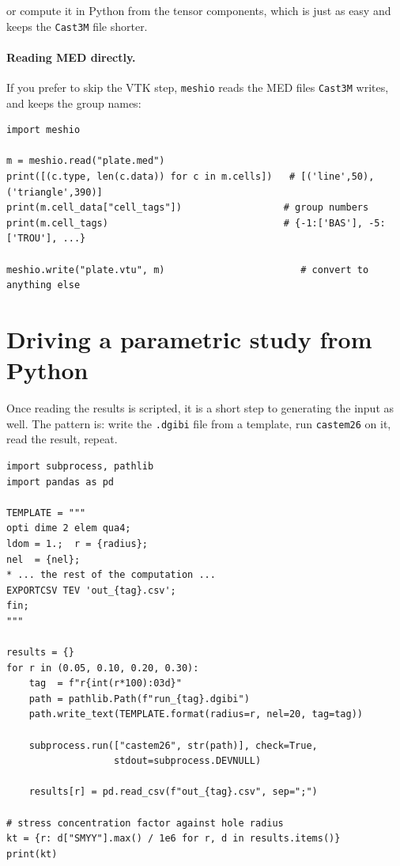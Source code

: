 \noindent or compute it in Python from the tensor components, which is just
as easy and keeps the \texttt{Cast3M} file shorter.

\paragraph{Reading MED directly.} If you prefer to skip the VTK step,
\texttt{meshio} reads the MED files \texttt{Cast3M} writes, and keeps the
group names:

\begin{codebox}
\begin{verbatim}
import meshio

m = meshio.read("plate.med")
print([(c.type, len(c.data)) for c in m.cells])   # [('line',50),('triangle',390)]
print(m.cell_data["cell_tags"])                  # group numbers
print(m.cell_tags)                               # {-1:['BAS'], -5:['TROU'], ...}

meshio.write("plate.vtu", m)                        # convert to anything else
\end{verbatim}
\end{codebox}

\section{Driving a parametric study from Python}
\label{sec:py:param}

%
Once reading the results is scripted, it is a short step to generating the
input as well. The pattern is: write the \texttt{.dgibi} file from a
template, run \texttt{castem26} on it, read the result, repeat.

\begin{codebox}
\begin{verbatim}
import subprocess, pathlib
import pandas as pd

TEMPLATE = """
opti dime 2 elem qua4;
ldom = 1.;  r = {radius};
nel  = {nel};
* ... the rest of the computation ...
EXPORTCSV TEV 'out_{tag}.csv';
fin;
"""

results = {}
for r in (0.05, 0.10, 0.20, 0.30):
    tag  = f"r{int(r*100):03d}"
    path = pathlib.Path(f"run_{tag}.dgibi")
    path.write_text(TEMPLATE.format(radius=r, nel=20, tag=tag))

    subprocess.run(["castem26", str(path)], check=True,
                   stdout=subprocess.DEVNULL)

    results[r] = pd.read_csv(f"out_{tag}.csv", sep=";")

# stress concentration factor against hole radius
kt = {r: d["SMYY"].max() / 1e6 for r, d in results.items()}
print(kt)
\end{verbatim}
\end{codebox}

